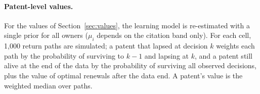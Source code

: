 \paragraph{Patent-level values.} For the values of Section~\ref{sec:values}, the learning model is re-estimated with a single prior for all owners
($\mu_i$ depends on the citation band only). For each cell, 1{,}000 return paths are simulated; a patent that lapsed at
decision $k$ weights each path by the probability of surviving to $k-1$ and lapsing at $k$, and a patent still alive
at the end of the data by the probability of surviving all observed decisions, plus the value of optimal renewals
after the data end. A patent's value is the weighted median over paths.
